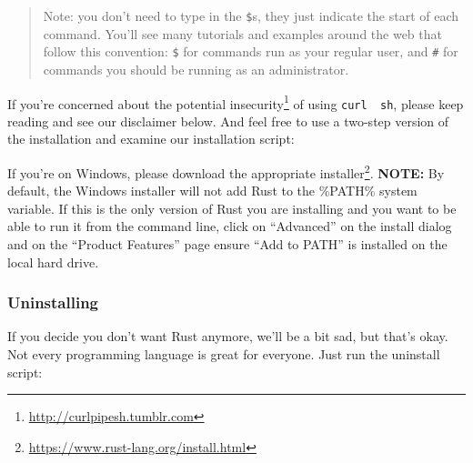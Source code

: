 \documentclass[a4paper,]{book}
\newenvironment{Shaded}{\begin{snugshade}}{\end{snugshade}}
\newcommand{\KeywordTok}[1]{\textcolor[rgb]{0.13,0.29,0.53}{\textbf{{#1}}}}
\newcommand{\NormalTok}[1]{{#1}}
\renewcommand{\href}[2]{#2\footnote{\url{#1}}}
\begin{document}
\begin{quote}
Note: you don't need to type in the \texttt{\$}s, they just indicate the
start of each command. You'll see many tutorials and examples around the
web that follow this convention: \texttt{\$} for commands run as your
regular user, and \texttt{\#} for commands you should be running as an
administrator.
\end{quote}

\begin{Shaded}
\end{Shaded}

If you're concerned about the
\href{http://curlpipesh.tumblr.com}{potential insecurity} of using
\texttt{curl\ \textbar{}\ sh}, please keep reading and see our
disclaimer below. And feel free to use a two-step version of the
installation and examine our installation script:

\begin{Shaded}
\end{Shaded}

If you're on Windows, please download the appropriate
\href{https://www.rust-lang.org/install.html}{installer}. \textbf{NOTE:}
By default, the Windows installer will not add Rust to the \%PATH\%
system variable. If this is the only version of Rust you are installing
and you want to be able to run it from the command line, click on
``Advanced'' on the install dialog and on the ``Product Features'' page
ensure ``Add to PATH'' is installed on the local hard drive.

\subsubsection{Uninstalling}\label{uninstalling}

If you decide you don't want Rust anymore, we'll be a bit sad, but
that's okay. Not every programming language is great for everyone. Just
run the uninstall script:

\begin{Shaded}
\end{Shaded}
\end{document}
